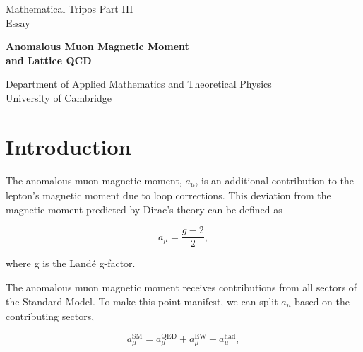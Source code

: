 \documentclass{article}
\numberwithin{equation}{section} %
\begin{document}
\begin{titlepage}
\begin{center}
\vspace*{1cm}
Mathematical Tripos Part III\\Essay
\vspace{0.5cm}

{\LARGE \textbf{Anomalous Muon Magnetic Moment \\and Lattice QCD}}
\vspace{3cm}

\vspace{1cm}
\vspace{7cm}
Department of Applied Mathematics and Theoretical Physics\\
University of Cambridge\\


\end{center}
\end{titlepage}

\newcommand{\amu}{$a_\mu$ }

\tableofcontents

\newpage

\section{Introduction}\label{intro}
The anomalous muon magnetic moment, $a_\mu$, is an additional contribution to the lepton's magnetic moment due to loop corrections. This deviation from the magnetic moment predicted by Dirac's theory can be defined as\cite{lehnerg2}

\begin{equation}
a_\mu = \frac{g-2}{2},
\label{amu}
\end{equation}

\noindent where g is the Land\'e g-factor.  

The anomalous muon magnetic moment receives contributions from all sectors of the Standard Model. To make this point manifest, we can split \amu based on the contributing sectors\cite{hoecker},

\begin{equation}
a^{\mathrm{SM}}_\mu= a_\mu^{\mathrm{QED}} + a_\mu^{\mathrm{EW}} + a_\mu^{\mathrm{had}},
\label{asm}
\end{equation}
\end{document}
